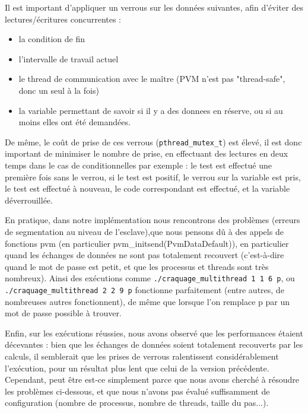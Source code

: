 \documentclass[a4paper,11pt]{article}
\begin{document}
Il est important d'appliquer un verrous sur les données suivantes, afin d'éviter des lectures/écritures concurrentes :
\begin{itemize}
\item la condition de fin 
\item l'intervalle de travail actuel
\item le thread de communication avec le maître (PVM n'est pas "thread-safe", donc un seul à la fois)
\item la variable permettant de savoir si il y a des donnees en réserve, ou si au moins elles ont été demandées.
\end{itemize}
De même, le coût de prise de ces verrous (\texttt{pthread_mutex_t}) est élevé, il est donc important de minimiser le nombre de prise, en effectuant des lectures en deux temps dans le cas de conditionnelles par exemple :
le test est effectué une première fois sans le verrou, si le test est positif, le verrou sur la variable est pris, le test est effectué à nouveau, le code correspondant est effectué, et la variable déverrouillée.

En pratique, dans notre implémentation nous rencontrons des problèmes (erreurs de segmentation au niveau de l'esclave),que nous pensons dû à des appels de fonctions pvm (en particulier pvm_initsend(PvmDataDefault)), en particulier quand les échanges de données ne sont pas totalement recouvert (c'est-à-dire quand le mot de passe est petit, et que les processus et threads sont très nombreux).
Ainsi des exécutions comme \texttt{./craquage_multithread 1 1 6 p}, ou \texttt{./craquage_multithread 2 2 9 p} fonctionne parfaitement (entre autres, de nombreuses autres fonctionnent), de même que lorsque l'on remplace p par un mot de passe possible à trouver.


Enfin, sur les exécutions réussies, nous avons observé que les performances étaient décevantes : bien que les échanges de données soient totalement recouverts par les calculs, il semblerait que les prises de verrous ralentissent considérablement l'exécution, pour un résultat plus lent que celui de la version précédente.
Cependant, peut être est-ce simplement parce que nous avons cherché à résoudre les problèmes ci-dessous, et que nous n'avons pas évalué suffisamment de configuration (nombre de processus, nombre de threads, taille du pas...).
\end{document}
